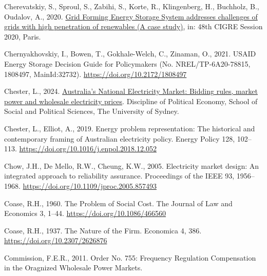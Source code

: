 \documentclass[12pt,a4paper,]{report}
\newlength{\cslhangindent}
\newenvironment{CSLReferences}[2] %
 {%
  \setlength{\parindent}{0pt}
  \ifodd #1 \everypar{\setlength{\hangindent}{\cslhangindent}}\ignorespaces\fi
  \ifnum #2 > 0
  \setlength{\parskip}{#2\baselineskip}
  \fi
 }%
 {}
\begin{document}
\begin{CSLReferences}{1}{0}
\leavevmode{}%
Cherevatskiy, S., Sproul, S., Zabihi, S., Korte, R., Klingenberg, H.,
Buchholz, B., Oudalov, A., 2020.
\href{https://e-cigre.org/publication/SESSION2020_C2-C6-322}{Grid
{Forming Energy Storage System} addresses challenges of grids with high
penetration of renewables ({A} case study)}, in: 48th {CIGRE Session}
2020, {Paris}.

\leavevmode{}%
Chernyakhovskiy, I., Bowen, T., Gokhale-Welch, C., Zinaman, O., 2021.
{USAID Energy Storage Decision Guide} for {Policymakers} (No.
NREL/TP-6A20-78815, 1808497, MainId:32732).
\url{https://doi.org/10.2172/1808497}

\leavevmode{}%
Chester, L., 2024.
\href{https://ses.library.usyd.edu.au/bitstream/handle/2123/32110/Australia\%27s\%20NEM_Bidding\%20rules\%20market\%20power\%20and\%20wholesale\%20electricity\%20prices\%20FINAL\%20UPDATED\%202\%20FEBRUARY\%202024.pdf?sequence=3}{Australia's
{National Electricity Market}: {Bidding} rules, market power and
wholesale electricity prices}. {Discipline of Political Economy, School
of Social and Political Sciences, The University of Sydney}.

\leavevmode{}%
Chester, L., Elliot, A., 2019. Energy problem representation: {The}
historical and contemporary framing of {Australian} electricity policy.
Energy Policy 128, 102--113.
\url{https://doi.org/10.1016/j.enpol.2018.12.052}

\leavevmode{}%
Chow, J.H., De Mello, R.W., Cheung, K.W., 2005. Electricity market
design: {An} integrated approach to reliability assurance. Proceedings
of the IEEE 93, 1956--1968.
\url{https://doi.org/10.1109/jproc.2005.857493}

\leavevmode{}%
Coase, R.H., 1960. The {Problem} of {Social Cost}. The Journal of Law
and Economics 3, 1--44. \url{https://doi.org/10.1086/466560}

\leavevmode{}%
Coase, R.H., 1937. The {Nature} of the {Firm}. Economica 4, 386.
\url{https://doi.org/10.2307/2626876}

\leavevmode{}%
Commission, F.E.R., 2011. Order {No}. 755: {Frequency Regulation
Compensation} in the {Oragnized Wholesale Power Markets}.


\end{CSLReferences}
\end{document}
